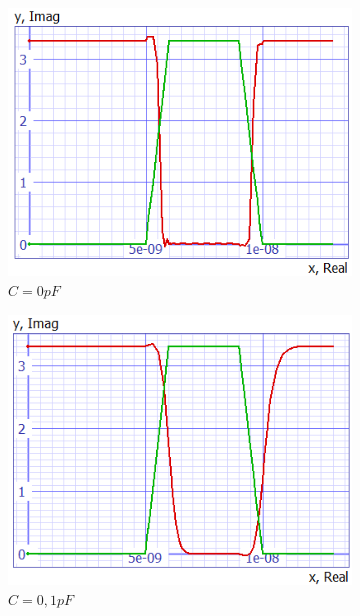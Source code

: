 \documentclass[../main.tex]{subfiles}
\begin{document}
{		\begin{figure}[H]
			\centering
			\begin{subfigure}{0.3\textwidth}
				\centering
				\includegraphics[width=\textwidth]{plots/Q6_0pf.png}
				\caption{$C = 0pF$}
				\label{fig:subfig1}
			\end{subfigure}
			\begin{subfigure}{0.3\textwidth}
				\centering
				\includegraphics[width=\textwidth]{plots/Q6_01pf.png}
				\caption{$C = 0,1pF$}
				\label{fig:subfig2}
			\end{subfigure}
			\begin{subfigure}{0.3\textwidth}

\end{subfigure}
\end{figure}}
\end{document}
